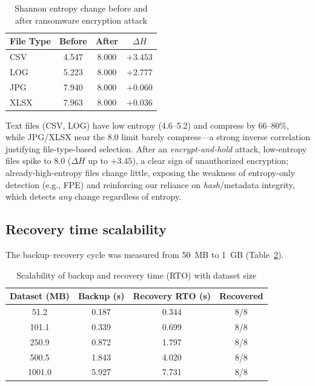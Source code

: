 \documentclass{iaesarticle}
\begin{document}
\begin{table}[H]
\centering
\fontsize{8pt}{10pt}\selectfont
\caption{Shannon entropy change before and after ransomware encryption attack}
\label{tab:entropy_attack}
\begin{tabular}{l c c c}
\hline
\textbf{File Type} & \textbf{Before} & \textbf{After} & \textbf{$\Delta H$} \\
\hline
CSV  & 4.547 & 8.000 & $+3.453$ \\
LOG  & 5.223 & 8.000 & $+2.777$ \\
JPG  & 7.940 & 8.000 & $+0.060$ \\
XLSX & 7.963 & 8.000 & $+0.036$ \\
\hline
\end{tabular}
\end{table}

Text files (CSV, LOG) have low entropy (4.6--5.2) and compress by 66--80\%, while JPG/XLSX near the 8.0 limit barely compress---a strong inverse correlation justifying file-type-based selection. After an \textit{encrypt-and-hold} attack, low-entropy files spike to 8.0 ($\Delta H$ up to $+3.45$), a clear sign of unauthorized encryption; already-high-entropy files change little, exposing the weakness of entropy-only detection (e.g., FPE) and reinforcing our reliance on \textit{hash}/metadata integrity, which detects \textit{any} change regardless of entropy.

\subsection{Recovery time scalability}
The backup--recovery cycle was measured from 50~MB to 1~GB (Table~\ref{tab:scalability}).

\begin{table}[H]
\centering
\fontsize{8pt}{10pt}\selectfont
\caption{Scalability of backup and recovery time (RTO) with dataset size}
\label{tab:scalability}
\begin{tabular}{c c c c}
\hline
\textbf{Dataset (MB)} & \textbf{Backup (s)} & \textbf{Recovery RTO (s)} & \textbf{Recovered} \\
\hline
51.2   & 0.187 & 0.344 & 8/8 \\
101.1  & 0.339 & 0.699 & 8/8 \\
250.9  & 0.872 & 1.797 & 8/8 \\
500.5  & 1.843 & 4.020 & 8/8 \\
1001.0 & 5.927 & 7.731 & 8/8 \\
\hline
\end{tabular}
\end{table}
\end{document}
